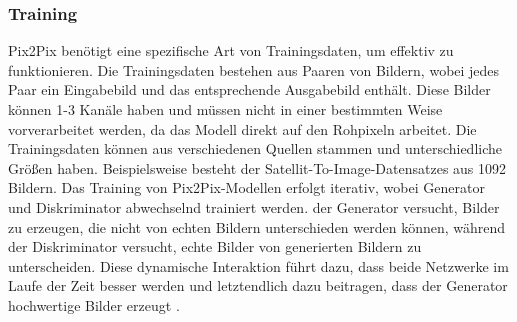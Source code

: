 \subsubsection{Training}
Pix2Pix benötigt eine spezifische Art von Trainingsdaten, um effektiv zu funktionieren. Die Trainingsdaten bestehen aus Paaren von Bildern, wobei jedes Paar ein Eingabebild und das entsprechende Ausgabebild enthält. Diese Bilder können 1-3 Kanäle haben und müssen nicht in einer bestimmten Weise vorverarbeitet werden, da das Modell direkt auf den Rohpixeln arbeitet. Die Trainingsdaten können aus verschiedenen Quellen stammen und unterschiedliche Größen haben. Beispielsweise besteht der Satellit-To-Image-Datensatzes aus 1092 Bildern. \newline
Das Training von Pix2Pix-Modellen erfolgt iterativ, wobei Generator und Diskriminator abwechselnd trainiert werden. der Generator versucht, Bilder zu erzeugen, die nicht von echten Bildern unterschieden werden können, während der Diskriminator versucht, echte Bilder von generierten Bildern zu unterscheiden. Diese dynamische Interaktion führt dazu, dass beide Netzwerke im Laufe der Zeit besser werden und letztendlich dazu beitragen, dass der Generator hochwertige Bilder erzeugt \cite{Isola}. \newline
  

